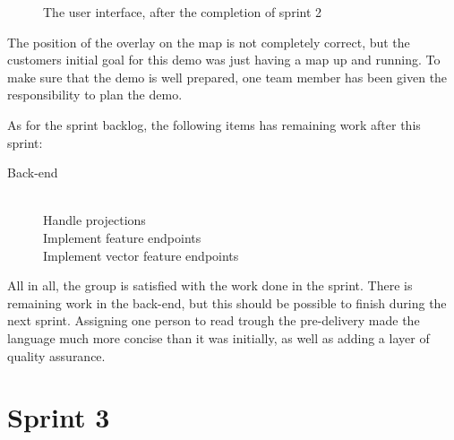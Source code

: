 \documentclass[11pt,a4paper,titlepage,oneside]{report}
\begin{document}
\begin{figure}[h]
\begin{center}
\caption{The user interface, after the completion of sprint 2}
\label{fig:UIAfterSprint2}
\end{center}
\end{figure}

The position of the overlay on the map is not completely correct, but the customers initial goal for this demo was just having a map up and running. To make sure that the demo is well prepared, one team member has been given the responsibility to plan the demo. 

As for the sprint backlog, the following items has remaining work after this sprint:

\begin{description}
	\item[Back-end] \hfill \\
	Handle projections \hfill \\
	Implement feature endpoints \hfill \\
	Implement vector feature endpoints
\end{description}

All in all, the group is satisfied with the work done in the sprint. There is remaining work in the \gls{back-end}, but this should be possible to finish during the next sprint. Assigning one person to read trough the \gls{pre-delivery} made the language much more concise than it was initially, as well as adding a layer of quality assurance. 



\chapter{Sprint 3}
\end{document}
